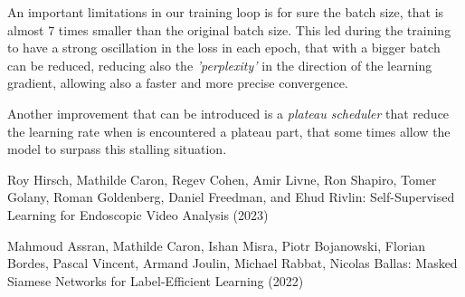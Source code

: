 \documentclass[column]{article}
\begin{document}
\begin{multicols}{2}
	An important limitations in our training loop is for sure the batch size, that is almost 7 times smaller than the original batch size. This led during the training to have a strong oscillation in the loss in each epoch, that with a bigger batch can be reduced, reducing also the \textit{'perplexity'} in the direction of the learning gradient, allowing also a faster and more precise convergence. 
	
	Another improvement that can be introduced is a \textit{plateau scheduler} that reduce the learning rate when is encountered a plateau part, that some times allow the model to surpass this stalling situation.
		
	\end{multicols}

	
	\begin{thebibliography}{9}
		
		Roy Hirsch, Mathilde Caron, Regev Cohen, Amir Livne, Ron Shapiro, Tomer Golany, Roman Goldenberg, Daniel Freedman, and Ehud Rivlin: Self-Supervised Learning for Endoscopic Video Analysis (2023)
		
		Mahmoud Assran, Mathilde Caron, Ishan Misra, Piotr Bojanowski, Florian Bordes, Pascal Vincent, Armand Joulin,  Michael Rabbat, Nicolas Ballas: Masked Siamese Networks for Label-Efficient Learning (2022)
		
	\end{thebibliography}
	
\end{document}
